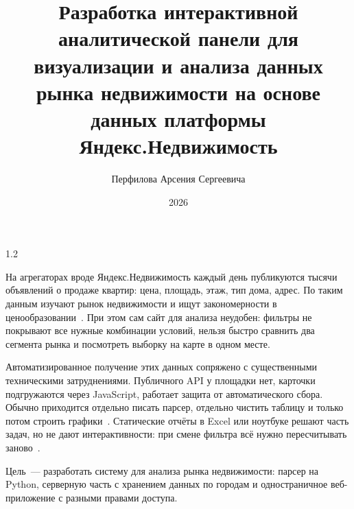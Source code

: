 \documentclass[coursework]{SCWorks}
\begin{document}

\title{Разработка интерактивной аналитической панели для визуализации и анализа данных рынка недвижимости на основе данных платформы Яндекс.Недвижимость}



\author{Перфилова Арсения Сергеевича}



\date{2026}

\begin{spacing}{1.2}
    \maketitle
\end{spacing}

\secNumbering

\tableofcontents
\clearpage

\intro

На агрегаторах вроде Яндекс.Недвижимость каждый день публикуются тысячи объявлений о продаже квартир: цена, площадь, этаж, тип дома, адрес. По таким данным изучают рынок недвижимости и ищут закономерности в ценообразовании~\cite{soboleva2023,belyaev2015}. При этом сам сайт для анализа неудобен: фильтры не покрывают все нужные комбинации условий, нельзя быстро сравнить два сегмента рынка и посмотреть выборку на карте в одном месте.

Автоматизированное получение этих данных сопряжено с существенными техническими затруднениями. Публичного API у площадки нет, карточки подгружаются через JavaScript, работает защита от автоматического сбора. Обычно приходится отдельно писать парсер, отдельно чистить таблицу и только потом строить графики~\cite{nesterov2024,selenium}. Статические отчёты в Excel или ноутбуке решают часть задач, но не дают интерактивности: при смене фильтра всё нужно пересчитывать заново~\cite{filatov2013,ahtimirov2024}.

Цель~--- разработать систему для анализа рынка недвижимости: парсер на Python, серверную часть с хранением данных по городам и одностраничное веб-приложение с разными правами доступа.
\end{document}
